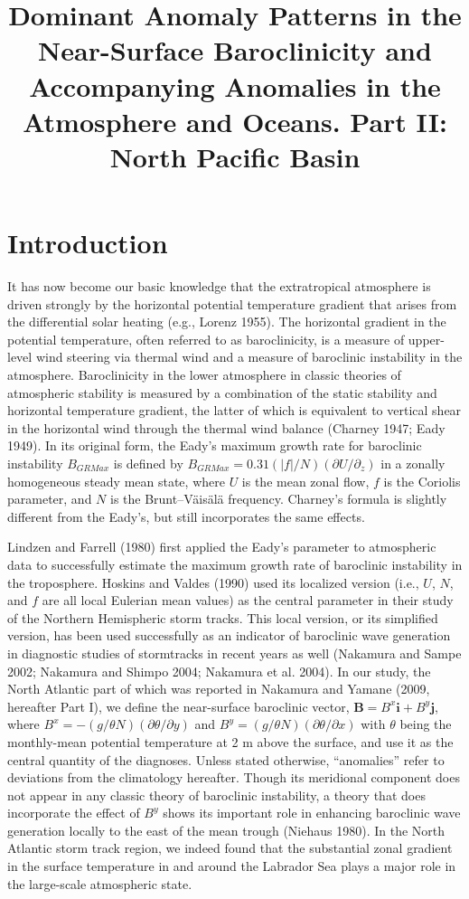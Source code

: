 \documentclass[twocol]{ametsocV5}
\title{Dominant Anomaly Patterns in the Near-Surface 
Baroclinicity and Accompanying
Anomalies in the Atmosphere and Oceans. 
Part II: North Pacific Basin}
\affiliation{Japan Agency for Marine-Earth Science and Technology, Yokohama,
Kanagawa, Japan}
\begin{document}
\maketitle


\section{Introduction}

It has now become our basic
knowledge that the extratropical
atmosphere is driven strongly by the horizontal
potential temperature gradient that arises from the
differential solar heating (e.g., Lorenz 1955). The horizontal
gradient in the potential temperature, often referred
to as baroclinicity, is a measure of upper-level wind
steering via thermal wind and a measure of baroclinic
instability in the atmosphere. Baroclinicity in the lower
atmosphere in classic theories of atmospheric stability is
measured by a combination of the static stability and
horizontal temperature gradient, the latter of which is
equivalent to vertical shear in the horizontal wind through
the thermal wind balance (Charney 1947; Eady 1949). In
its original form, the Eady's maximum growth rate for
baroclinic instability $B_{GRMax}$ is defined by $B_{GRMax} =
0.31(|f|/N)(\partial U/\partial_z)$ in a zonally homogeneous steady
mean state, where $U$ is the mean zonal flow, $f$ is the
Coriolis parameter, and $N$ is the Brunt--V\"ais\"al\"a frequency.
Charney's formula is slightly different from the Eady's,
but still incorporates the same effects.


Lindzen and Farrell (1980) first applied the Eady's parameter
to atmospheric data to successfully estimate the
maximum growth rate of baroclinic instability in the troposphere.
Hoskins and Valdes (1990) used its localized
version (i.e., $U$, $N$, and $f$ are all local Eulerian mean values)
as the central parameter in their study of the Northern
Hemispheric storm tracks. This local version, or its simplified
version, has been used successfully as an indicator
of baroclinic wave generation in diagnostic studies of
stormtracks in recent years as well (Nakamura and Sampe
2002; Nakamura and Shimpo 2004; Nakamura et al. 2004).
In our study, the North Atlantic part of which was reported
in Nakamura and Yamane (2009, hereafter Part I), we
define the near-surface baroclinic vector, $\mathbf{B}=B^x\mathbf{i} + 
B^y\mathbf{j}$,
where $B^x= -(g/\theta N)(\partial\theta/\partial y)$ 
and $B^y = (g/\theta N)(\partial\theta/\partial x)$  with
$\theta$ being the monthly-mean potential temperature at 2 m
above the surface, and use it as the central quantity of the
diagnoses. Unless stated otherwise, ``anomalies'' refer to
deviations from the climatology hereafter. Though its meridional
component does not appear in any classic theory of
baroclinic instability, a theory that does incorporate the
effect of $B^y$ shows its important role in enhancing baroclinic
wave generation locally to the east of the mean trough
(Niehaus 1980). In the North Atlantic storm track region,
we indeed found that the substantial zonal gradient in the
surface temperature in and around the Labrador Sea plays
a major role in the large-scale atmospheric state.
\end{document}
